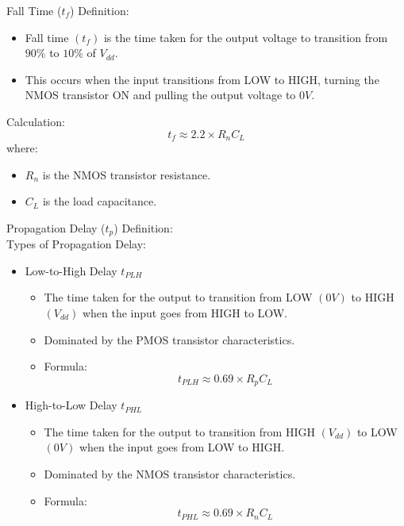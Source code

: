 \documentclass[9pt,conference]{IEEEtran}
\begin{document}
Fall Time (\( t_f \))
Definition:
\begin{itemize}
    \item Fall time \((t_f)\) is the time taken for the output voltage to transition from \(90\%\) to \(10\%\) of \( V_{dd} \).
    \item This occurs when the input transitions from LOW to HIGH, turning the NMOS transistor ON and pulling the output voltage to \( 0V \).
\end{itemize}
Calculation:
\begin{equation}
    t_f \approx 2.2 \times R_n C_L
\end{equation}
where:
\begin{itemize}
    \item \( R_n \) is the NMOS transistor resistance.
    \item \( C_L \) is the load capacitance.\\
\end{itemize}

Propagation Delay (\( t_p \))
Definition:
\\

Types of Propagation Delay:
\begin{itemize}
    \item Low-to-High Delay \( t_{PLH} \)
    \begin{itemize}
        \item The time taken for the output to transition from LOW \((0V)\) to HIGH \((V_{dd})\) when the input goes from HIGH to LOW.
        \item Dominated by the PMOS transistor characteristics.
        \item Formula:
        \begin{equation}
            t_{PLH} \approx 0.69 \times R_p C_L
        \end{equation}
    \end{itemize}
    
    \item High-to-Low Delay \( t_{PHL} \)
    \begin{itemize}
        \item The time taken for the output to transition from HIGH \((V_{dd})\) to LOW \((0V)\) when the input goes from LOW to HIGH.
        \item Dominated by the NMOS transistor characteristics.
        \item Formula:
        \begin{equation}
            t_{PHL} \approx 0.69 \times R_n C_L
        \end{equation}
    \end{itemize}
\end{itemize}
\end{document}
